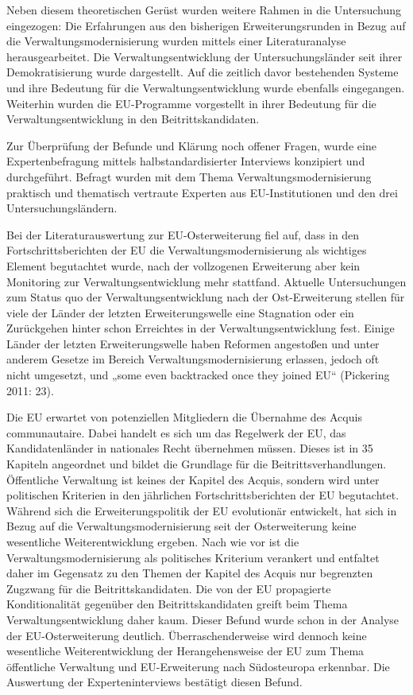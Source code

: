 Neben diesem theoretischen Gerüst wurden weitere Rahmen in die Untersuchung eingezogen: Die Erfahrungen aus den bisherigen Erweiterungsrunden in Bezug auf die Verwaltungsmodernisierung wurden mittels einer Literaturanalyse herausgearbeitet. Die Verwaltungsentwicklung der Untersuchungsländer seit ihrer Demokratisierung wurde dargestellt. Auf die zeitlich davor bestehenden Systeme und ihre Bedeutung für die Verwaltungsentwicklung wurde ebenfalls eingegangen. Weiterhin wurden die EU-Programme vorgestellt in ihrer Bedeutung für die Verwaltungsentwicklung in den Beitrittskandidaten.\par
Zur Überprüfung der Befunde und Klärung noch offener Fragen, wurde eine Expertenbefragung mittels halbstandardisierter Interviews konzipiert und durchgeführt. Befragt wurden mit dem Thema Verwaltungsmodernisierung praktisch und thematisch vertraute Experten aus EU-Institutionen und den drei Untersuchungsländern.\par
Bei der Literaturauswertung zur EU-Osterweiterung fiel auf, dass in den Fortschrittsberichten der EU die Verwaltungsmodernisierung als wichtiges Element begutachtet wurde, nach der vollzogenen Erweiterung aber kein Monitoring zur Verwaltungsentwicklung mehr stattfand.
Aktuelle Untersuchungen zum Status quo der Verwaltungsentwicklung nach der Ost-Erweiterung stellen für viele der Länder der letzten Erweiterungswelle eine Stagnation oder ein Zurückgehen hinter schon Erreichtes in der Verwaltungsentwicklung fest. Einige Länder der letzten Erweiterungswelle haben Reformen angestoßen und unter anderem Gesetze im Bereich Verwaltungsmodernisierung erlassen, jedoch oft nicht umgesetzt, und „some even backtracked once they joined EU“ (Pickering 2011: 23).\par
Die EU erwartet von potenziellen Mitgliedern die Übernahme des Acquis communautaire. Dabei handelt es sich um das Regelwerk der EU, das Kandidatenländer in nationales Recht übernehmen müssen. Dieses ist in 35 Kapiteln angeordnet und bildet die Grundlage für die Beitrittsverhandlungen. Öffentliche Verwaltung ist keines der Kapitel des Acquis, sondern wird unter politischen Kriterien in den jährlichen Fortschrittsberichten der EU begutachtet. Während sich die Erweiterungspolitik der EU evolutionär entwickelt, hat sich in Bezug auf die Verwaltungsmodernisierung seit der Osterweiterung keine wesentliche Weiterentwicklung ergeben. Nach wie vor ist die Verwaltungsmodernisierung als politisches Kriterium verankert und entfaltet daher im Gegensatz zu den Themen der Kapitel des Acquis nur begrenzten Zugzwang für die Beitrittskandidaten. Die von der EU propagierte Konditionalität gegenüber den Beitrittskandidaten greift beim Thema Verwaltungsentwicklung daher kaum. Dieser Befund wurde schon in der Analyse der EU-Osterweiterung deutlich. Überraschenderweise wird dennoch keine wesentliche Weiterentwicklung der Herangehensweise der EU zum Thema öffentliche Verwaltung und EU-Erweiterung nach Südosteuropa erkennbar. Die Auswertung der Experteninterviews bestätigt diesen Befund.\par
